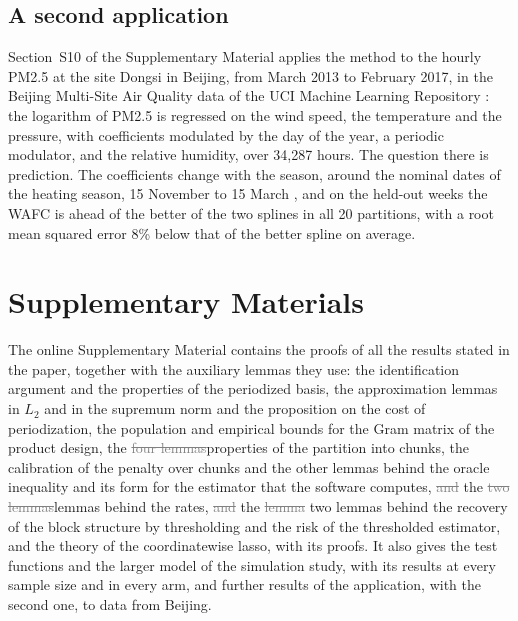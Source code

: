 \documentclass[12pt]{article} %
\theoremstyle{definition}
\theoremstyle{plain}
\begin{document}
{

\subsection{A second application}
\label{sec:app-beijing}

Section~S10 of the Supplementary Material applies the method to the hourly
PM2.5 at the site Dongsi in Beijing, from March 2013 to February 2017, in the
Beijing Multi-Site Air Quality data of the UCI Machine Learning Repository
\citep{Chen-UCI-2017, Zhang-Guo-Dong-He-Xu-Chen-2017}:
the logarithm of PM2.5 is regressed on the wind speed, the temperature and
the pressure, with coefficients modulated by the day of the year, a periodic
modulator, and the relative humidity, over 34,287 hours. The question there
is prediction. The coefficients change with the season, around the nominal
dates of the heating season, 15 November to 15 March
\citep[Section~7]{Liang-Zou-Guo-Li-Zhang-Zhang-Huang-Chen-2015}, and on the
held-out weeks the WAFC is ahead of the better of the two splines in all 20
partitions, with a root mean squared error 8\% below that of the better
spline on average.
}

\section*{Supplementary Materials}

The online Supplementary Material contains the proofs of all the results
stated in the paper, together with the auxiliary lemmas they use: the
identification argument and the properties of the periodized basis, the
approximation lemmas in $L_2$ and in the supremum norm and the proposition on
the cost of periodization, the population and empirical bounds for the Gram
matrix of the product design, the \textcolor{gray}{\sout{four lemmas}}\textcolor{colR1}{properties of the
partition into chunks, the calibration of the penalty over chunks and the
other lemmas} behind the oracle inequality \textcolor{colR1}{and its form for the
estimator that the software computes},
\textcolor{gray}{\sout{and}} the \textcolor{gray}{\sout{two lemmas}}\textcolor{colR1}{lemmas} behind the rates\textcolor{colR1}{, \textcolor{gray}{\sout{and}} the \textcolor{gray}{\sout{lemma}} two lemmas behind
the recovery of the block structure by thresholding} \textcolor{colR1}{and the risk of
the thresholded estimator, and the theory of the coordinatewise lasso, with
its proofs}\textcolor{colR1}{. It also gives the test functions and the larger
model of the simulation study, with its results at every sample size and in
every arm, and further results of the application, with the second one, to
data from Beijing}.
\end{document}
